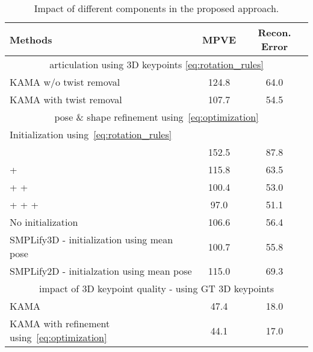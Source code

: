\begin{table}[t]
\scriptsize
\centering
\begin{tabularx}{1\columnwidth}{X|cc}
\toprule
\multirow{1}{*}{\bf Methods} & \bf MPVE & \bf Recon. Error \\
\midrule
\multicolumn{3}{c}{articulation using 3D keypoints \eqref{eq:rotation_rules}} \\
\midrule
KAMA w/o twist removal                & 124.8 & 64.0  \\
KAMA with twist removal                   & 107.7 & 54.5 \\
\midrule
\multicolumn{3}{c}{pose \& shape refinement using~\eqref{eq:optimization}} \\
\midrule
Initialization using~\eqref{eq:rotation_rules}   \\ 
\quad                                                    & 152.5 & 87.8  \\
\quad  +                          & 115.8 & 63.5 \\
\quad  +   +  & 100.4 & 53.0 \\
\quad  +   +   +    & 97.0 & 51.1 \\   
\midrule
No initialization                                   & 106.6      &  56.4  \\
SMPLify3D - initialization using mean pose          & 100.7 & 55.8   \\ 
SMPLify2D - initialzation using mean pose           &   115.0    &  69.3       \\
\midrule
\multicolumn{3}{c}{impact of 3D keypoint quality - using GT 3D keypoints} \\
\midrule
KAMA                &   47.4   &  18.0 \\
KAMA with refinement using~\eqref{eq:optimization}                &   44.1 & 17.0 \\
\bottomrule
\end{tabularx}
\caption{Impact of different components in the proposed approach.\vspace{-5mm}}
\label{tab:ablation}
\end{table} 



